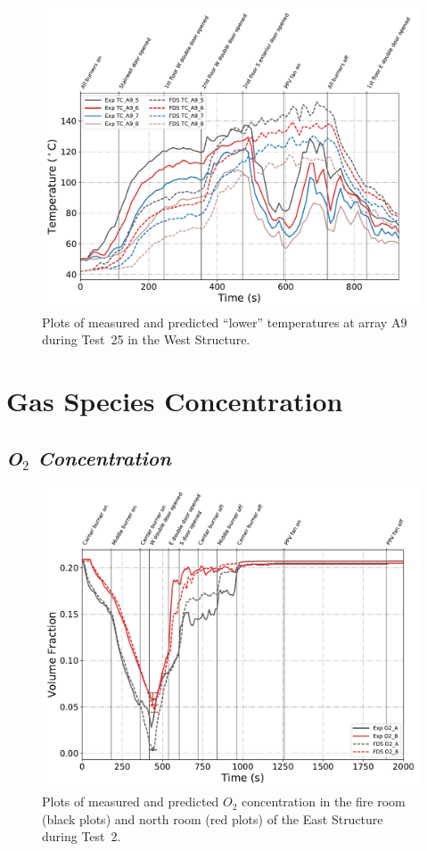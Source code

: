 \begin{figure}[!h]
	\centering
	\includegraphics[width=\columnwidth]{Figures/Plots/Validation/Temperature/Test_25_TC_A9_lower}
	\caption{Plots of measured and predicted ``lower'' temperatures at array A9 during Test~25 in the West Structure.}
	\label{fig:TCA9_lower_data_Test25}
\end{figure}
\clearpage

\section{Gas Species Concentration}
\subsection*{\textit{O$_2$ Concentration}}
\begin{figure}[!h]
	\centering
	\includegraphics[width=\columnwidth]{Figures/Plots/Validation/Gas_Concentration/Test_2_O2}
	\caption[Plots of measured and predicted $O_2$ concentration during Test~2.]{Plots of measured and predicted $O_2$ concentration in the fire room (black plots) and north room (red plots) of the East Structure during Test~2.}
	\label{fig:Test2_O2}
\end{figure}

